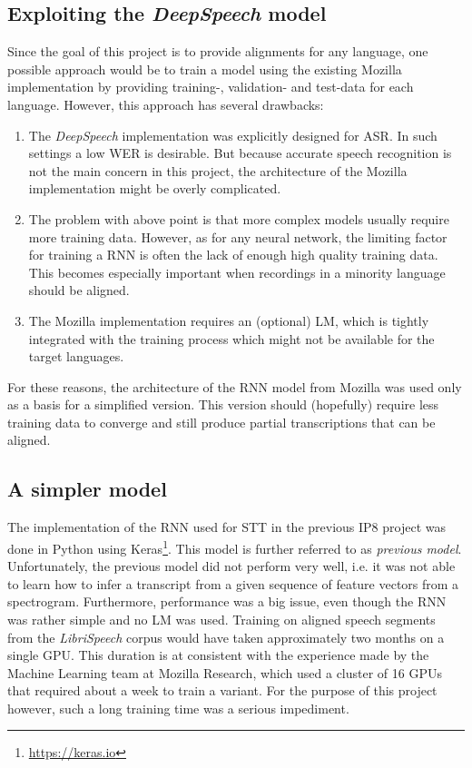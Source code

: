 \subsection{Exploiting the \textit{DeepSpeech} model}

Since the goal of this project is to provide alignments for any language, one possible approach would be to train a model using the existing Mozilla implementation by providing training-, validation- and test-data for each language. However, this approach has several drawbacks:

\begin{enumerate}
	\item The \textit{DeepSpeech} implementation was explicitly designed for \ac{ASR}. In such settings a low \ac{WER} is desirable. But because accurate speech recognition is not the main concern in this project, the architecture of the Mozilla implementation might be overly complicated. 
	\item The problem with above point is that more complex models usually require more training data. However, as for any neural network, the limiting factor for training a \ac{RNN} is often the lack of enough high quality training data. This becomes especially important when recordings in a minority language should be aligned. 
	\item The Mozilla implementation requires an (optional) \ac{LM}, which is tightly integrated with the training process which might not be available for the target languages.
\end{enumerate}

For these reasons, the architecture of the \ac{RNN} model from Mozilla was used only as a basis for a simplified version. This version should (hopefully) require less training data to converge and still produce partial transcriptions that can be aligned.

\subsection{A simpler model}

The implementation of the \ac{RNN} used for \ac{STT} in the previous IP8 project was done in Python using Keras\footnote{\url{https://keras.io}}. This model is further referred to as \textit{previous model}. Unfortunately, the previous model did not perform very well, i.e. it was not able to learn how to infer a transcript from a given sequence of feature vectors from a spectrogram. Furthermore, performance was a big issue, even though the \ac{RNN} was rather simple and no \ac{LM} was used. Training on aligned speech segments from the \textit{LibriSpeech} corpus would have taken approximately two months on a single \ac{GPU}. This duration is at consistent with the experience made by the Machine Learning team at Mozilla Research, which used a cluster of 16 \acsp{GPU} that required about a week \parencite{mozillajourney} to train a variant. For the purpose of this project however, such a long training time was a serious impediment.

